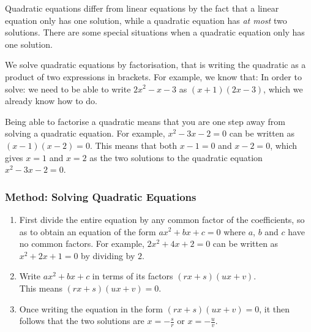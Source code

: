 \documentclass[10pt,a4paper,titlepage,twoside,openright]{report}
\begin{document}
Quadratic equations differ from linear equations by the fact that a linear
equation only has one solution, while a quadratic equation has \textit{at most}
two solutions. There are some special situations when a quadratic equation only
has one solution.

We solve quadratic equations by factorisation, that is writing the quadratic as
a product of two expressions in brackets. For example, we know that:
In order to solve:
we need to be able to write $2x^2-x-3$ as $(x+1)(2x-3)$, which we already know
how to do.


Being able to factorise a quadratic means that you are one step away from
solving a quadratic equation. For example, $x^2-3x-2=0$ can be written as
$(x-1)(x-2)=0$. This means that both $x-1=0$ and $x-2=0$, which gives $x=1$ and
$x=2$ as the two solutions to the quadratic equation $x^2-3x-2=0$.

\subsubsection{Method: Solving Quadratic Equations}{
\begin{enumerate}
\item{First divide the entire equation by any common factor of the coefficients,
so as to obtain an equation of the form $ax^{2} + bx + c = 0$ where $a$, $b$ and
$c$ have no common factors. For example, $2x^{2} + 4x + 2 = 0$ can be written as
$x^{2} + 2x + 1 = 0$ by dividing by $2$.}
\item{Write $ax^{2} + bx + c$ in terms of its factors $(rx + s)(ux + v)$.\\
This means $(rx + s)(ux + v)=0$.}
\item{Once writing the equation in the form $(rx + s)(ux + v) = 0$, it then
follows that the two solutions are $x = -\frac{s}{r}$ or $x = -\frac{u}{v}$.}
\end{enumerate}}

\end{document}
